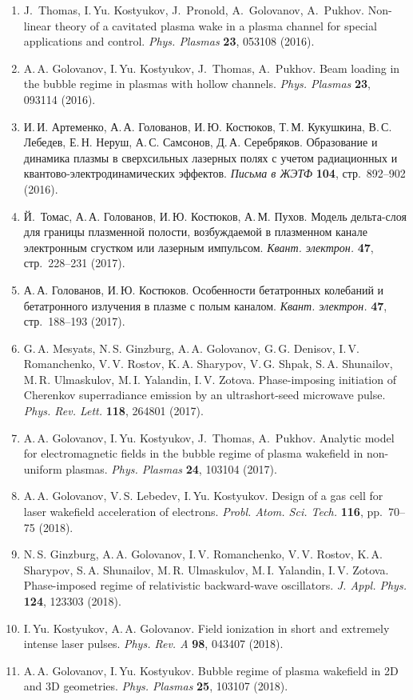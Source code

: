 \documentclass[12pt,a4paper]{scrartcl}
\begin{document}
\begin{enumerate}[parsep=0em, itemsep=0.3em]
\item{J.~Thomas, I.\,Yu. Kostyukov, J.~Pronold, A.~Golovanov, A.~Pukhov. Non-linear theory of a cavitated plasma wake in a plasma channel for special applications and control. \textit{Phys. Plasmas} \textbf{23}, 053108 (2016).}
\item{A.\,A. Golovanov, I.\,Yu. Kostyukov, J.~Thomas, A.~Pukhov. Beam loading in the bubble regime in plasmas with hollow channels. \textit{Phys. Plasmas} \textbf{23}, 093114 (2016).}
\item{ И.\,И. Артеменко, А.\,А. Голованов, И.\,Ю. Костюков, Т.\,М. Кукушкина, В.\,С. Лебедев, Е.\,Н. Неруш, А.\,С. Самсонов, Д.\,А. Серебряков. Образование и динамика плазмы в сверхсильных лазерных полях с учетом радиационных и квантово-электродинамических эффектов. \textit{Письма в ЖЭТФ} \textbf{104}, стр.~892--902 (2016).}
\item{ Й.~Томас, А.\,А. Голованов, И.\,Ю. Костюков, А.\,М. Пухов. Модель дельта-слоя для границы плазменной полости, возбуждаемой в плазменном канале электронным сгустком или лазерным импульсом. \textit{Квант. электрон.} \textbf{47}, стр.~228--231 (2017).}
\item{ А.\,А. Голованов, И.\,Ю. Костюков. Особенности бетатронных колебаний и бетатронного излучения в плазме с полым каналом. \textit{Квант. электрон.} \textbf{47}, стр.~188--193 (2017).}
\item{G.\,A. Mesyats, N.\,S. Ginzburg, A.\,A. Golovanov, G.\,G. Denisov, I.\,V. Romanchenko, V.\,V. Rostov, K.\,A. Sharypov, V.\,G. Shpak, S.\,A. Shunailov, M.\,R. Ulmaskulov, M.\,I. Yalandin, I.\,V. Zotova. Phase-imposing initiation of Cherenkov superradiance emission by an ultrashort-seed microwave pulse. \textit{Phys. Rev. Lett.} \textbf{118}, 264801 (2017).}
\item{A.\,A. Golovanov, I.\,Yu. Kostyukov, J.~Thomas, A.~Pukhov. Analytic model for electromagnetic fields in the bubble regime of plasma wakefield in non-uniform plasmas. \textit{Phys. Plasmas} \textbf{24}, 103104 (2017).}
\item{A.\,A. Golovanov, V.\,S. Lebedev, I.\,Yu. Kostyukov. Design of a gas cell for laser wakefield acceleration of electrons. \textit{Probl. Atom. Sci. Tech.} \textbf{116}, pp.~70--75 (2018).}
\item{N.\,S. Ginzburg, A.\,A. Golovanov, I.\,V. Romanchenko, V.\,V. Rostov, K.\,A. Sharypov, S.\,A. Shunailov, M.\,R. Ulmaskulov, M.\,I. Yalandin, I.\,V. Zotova. Phase-imposed regime of relativistic backward-wave oscillators. \textit{J. Appl. Phys.} \textbf{124}, 123303 (2018).}
\item{I.\,Yu. Kostyukov, A.\,A. Golovanov. Field ionization in short and extremely intense laser pulses. \textit{Phys. Rev. A} \textbf{98}, 043407 (2018).}
\item{A.\,A. Golovanov, I.\,Yu. Kostyukov. Bubble regime of plasma wakefield in 2D and 3D geometries. \textit{Phys. Plasmas} \textbf{25}, 103107 (2018).}
\end{enumerate}
\end{document}
